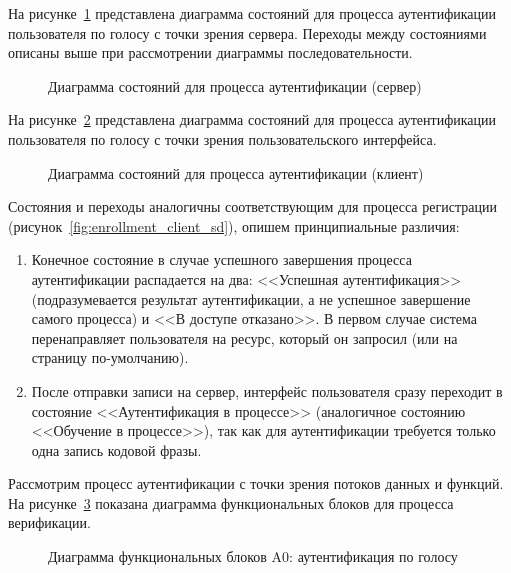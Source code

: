 На рисунке~\ref{fig:verification_server_sd} представлена диаграмма состояний
для процесса аутентификации пользователя по голосу с точки зрения сервера.
Переходы между состояниями описаны выше при рассмотрении диаграммы
последовательности.

\begin{figure}
    \caption{Диаграмма состояний для процесса аутентификации (сервер)}
    \label{fig:verification_server_sd}
\end{figure}

На рисунке~\ref{fig:verification_client_sd} представлена диаграмма состояний для
процесса аутентификации пользователя по голосу с точки зрения пользовательского
интерфейса.

\begin{figure}[htp!]
    \caption{Диаграмма состояний для процесса аутентификации (клиент)}
    \label{fig:verification_client_sd}
\end{figure}

Состояния и переходы аналогичны соответствующим для процесса регистрации
(рисунок~\ref{fig:enrollment_client_sd}), опишем принципиальные различия:

\begin{enumerate}
\item Конечное состояние в случае успешного завершения процесса аутентификации
распадается на два: <<Успешная аутентификация>> (подразумевается результат
аутентификации, а не успешное завершение самого процесса) и <<В доступе
отказано>>. В первом случае система перенаправляет пользователя на ресурс,
который он запросил (или на страницу по-умолчанию).
\item После отправки записи на сервер, интерфейс пользователя сразу переходит в
состояние <<Аутентификация в процессе>> (аналогичное состоянию <<Обучение в
процессе>>), так как для аутентификации требуется только одна запись кодовой
фразы.
\end{enumerate}

Рассмотрим процесс аутентификации с точки зрения потоков данных и функций. На
рисунке~\ref{fig:idef0_main} показана диаграмма функциональных блоков для
процесса верификации.

\begin{figure}
    \caption{Диаграмма функциональных блоков A0: аутентификация по голосу}
    \label{fig:idef0_main}
\end{figure}

